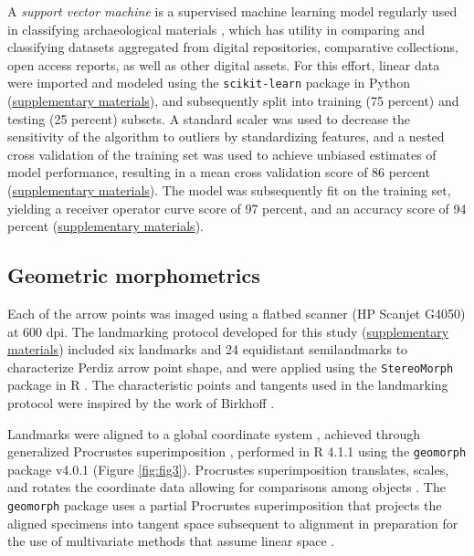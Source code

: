 \documentclass[smallextended]{svjour3}       %
\begin{document}
A \emph{support vector machine} is a supervised machine learning model
regularly used in classifying archaeological materials
\cite{RN9515,RN9516,RN9514,RN9513,RN10755,RN10754}, which has utility in
comparing and classifying datasets aggregated from digital repositories,
comparative collections, open access reports, as well as other digital
assets. For this effort, linear data were imported and modeled using the
\texttt{scikit-learn} package in Python \cite{scikit-learn,sklearn_api}
(\href{https://seldenlab.github.io/perdiz3/}{supplementary materials}),
and subsequently split into training (75 percent) and testing (25
percent) subsets. A standard scaler was used to decrease the sensitivity
of the algorithm to outliers by standardizing features, and a nested
cross validation of the training set was used to achieve unbiased
estimates of model performance, resulting in a mean cross validation
score of 86 percent
(\href{https://seldenlab.github.io/perdiz3/}{supplementary materials}).
The model was subsequently fit on the training set, yielding a receiver
operator curve score of 97 percent, and an accuracy score of 94 percent
(\href{https://seldenlab.github.io/perdiz3/}{supplementary materials}).

\hypertarget{geometric-morphometrics}{%
\subsection{Geometric morphometrics}\label{geometric-morphometrics}}

Each of the arrow points was imaged using a flatbed scanner (HP Scanjet
G4050) at 600 dpi. The landmarking protocol developed for this study
(\href{https://seldenlab.github.io/perdiz3/}{supplementary materials})
included six landmarks and 24 equidistant semilandmarks to characterize
Perdiz arrow point shape, and were applied using the
\texttt{StereoMorph} package in R \cite{RN8973}. The characteristic
points and tangents used in the landmarking protocol were inspired by
the work of Birkhoff \cite{RN5700}.

Landmarks were aligned to a global coordinate system
\cite{RN8102,RN8587,RN8384}, achieved through generalized Procrustes
superimposition \cite{RN8525}, performed in R 4.1.1 \cite{RN8584} using
the \texttt{geomorph} package v4.0.1 \cite{RN8565,RN9565} (Figure
\ref{fig:fig3}). Procrustes superimposition translates, scales, and
rotates the coordinate data allowing for comparisons among objects
\cite{RN5698,RN8525}. The \texttt{geomorph} package uses a partial
Procrustes superimposition that projects the aligned specimens into
tangent space subsequent to alignment in preparation for the use of
multivariate methods that assume linear space \cite{RN8511,RN8384}.
\end{document}
